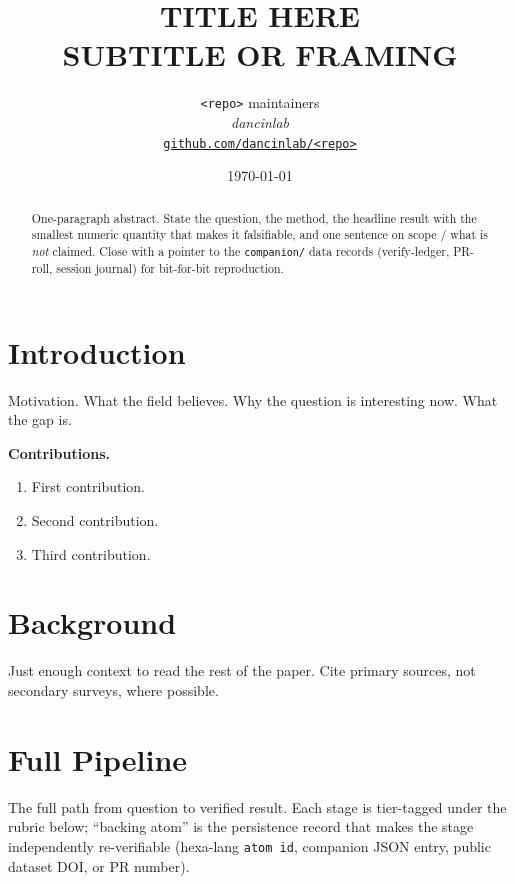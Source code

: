 \documentclass[11pt,a4paper]{article}
\title{
  \textbf{TITLE HERE}\\[4pt]
  \large SUBTITLE OR FRAMING
}
\author{
  \texttt{<repo>} maintainers\\
  \normalsize\textit{dancinlab}\\[2pt]
  \normalsize\href{https://github.com/dancinlab/<repo>}{\texttt{github.com/dancinlab/<repo>}}
}
\date{\today}
\begin{document}
\maketitle

\begin{abstract}
One-paragraph abstract. State the question, the method, the headline
result with the smallest numeric quantity that makes it falsifiable,
and one sentence on scope / what is \emph{not} claimed. Close with a
pointer to the \texttt{companion/} data records (verify-ledger,
PR-roll, session journal) for bit-for-bit reproduction.
\end{abstract}

\section{Introduction}
\label{sec:intro}

Motivation. What the field believes. Why the question is interesting
now. What the gap is. \cite{placeholder2024}

\medskip
\noindent\textbf{Contributions.}
\begin{enumerate}\itemsep0.3em
\item First contribution.
\item Second contribution.
\item Third contribution.
\end{enumerate}

\section{Background}
\label{sec:bg}

Just enough context to read the rest of the paper. Cite primary
sources, not secondary surveys, where possible.
\cite{placeholderBook,placeholderConf}

\section{Full Pipeline}
\label{sec:pipeline}

The full path from question to verified result. Each stage is tier-tagged
under the rubric below; ``backing atom'' is the persistence record that
makes the stage independently re-verifiable (hexa-lang \texttt{atom id},
companion JSON entry, public dataset DOI, or PR number).
\end{document}
